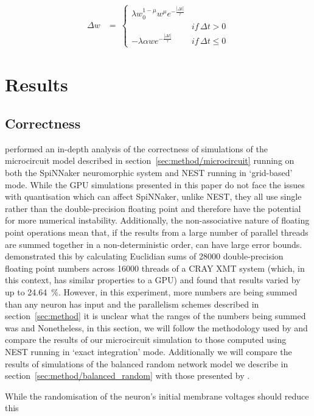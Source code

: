 \documentclass[utf8]{frontiersSCNS} %
\begin{document}
\begin{align}
    \Delta w & = \
        \begin{cases}
            \lambda w_{0}^{1-\mu} w^{\mu} e^{-\frac{|\Delta t|}{\tau}}\\ & if\, \Delta t>0\\
            -\lambda \alpha w e^{-\frac{|\Delta t|}{\tau}} & if\, \Delta t\leq0
        \end{cases}
\end{align}

\section{Results}
\subsection{Correctness}
\citet{VanAlbada2018} performed an in-depth analysis of the correctness of simulations of the microcircuit model described in section~\ref{sec:method/microcircuit} running on both the SpiNNaker neuromorphic system and NEST running in `grid-based' mode.
While the GPU simulations presented in this paper do not face the issues with quantisation which can affect SpiNNaker, unlike NEST, they all use single rather than the double-precision floating point and therefore have the potential for more numerical instability.
Additionally, the non-associative nature of floating point operations mean that, if the results from a large number of parallel threads are summed together in a non-deterministic order, can have large error bounds.
\citet{Villa2009} demonstrated this by calculating Euclidian sums of \num{28000} double-precision floating point numbers across \num{16000} threads of a CRAY XMT system (which, in this context, has similar properties to a GPU) and found that results varied by up to \SI{24.64}{\percent}.
However, in this experiment, more numbers are being summed than any neuron has input and the parallelism schemes described in section~\ref{sec:method} it is unclear what the ranges of the numbers being summed was and
Nonetheless, in this section, we will follow the methodology used by \citet{VanAlbada2018} and compare the results of our microcircuit simulation to those computed using NEST running in `exact integration' mode.
Additionally we will compare the results of simulations of the balanced random network model we describe in section~\ref{sec:method/balanced_random} with those presented by \citet{Morrison2007}.

While the randomisation of the neuron's initial membrane voltages should reduce this 
\end{document}
